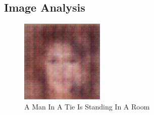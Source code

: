 \documentclass{article}%
\begin{document}
%
\subsection{Image Analysis}%
\label{subsec:ImageAnalysis}%


\begin{figure}[h!]%
\centering%
\includegraphics[width=150px]{500_fake_images/samples_5_49.png}%
\caption{A Man In A Tie Is Standing In A Room}%
\end{figure}

%
\end{document}
